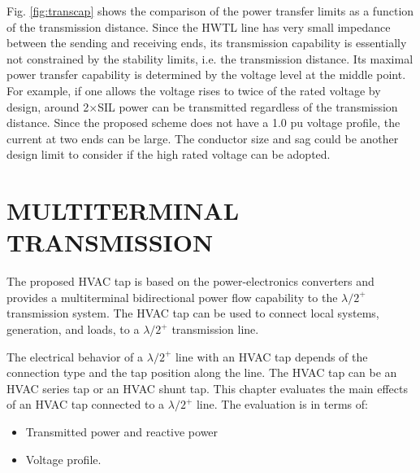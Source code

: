 \documentclass[12pt,a4paper]{reportmod}
\begin{document}
\par Fig. \ref{fig:transcap} shows the comparison of the power transfer limits as a function of the transmission distance. Since the HWTL line has very small impedance between the sending and receiving ends, its transmission capability is essentially not constrained by the stability limits, i.e. the transmission distance. Its maximal power transfer capability is determined by the voltage level at the middle point. For example, if one allows the voltage rises to twice of the rated voltage by design, around 2$\times$SIL power can be transmitted regardless of the transmission distance. Since the proposed scheme does not have a 1.0 pu voltage profile, the current at two ends can be large. The conductor size and sag could be another design limit to consider if the high rated voltage can be adopted.
\chapter{MULTITERMINAL TRANSMISSION}
\par The proposed HVAC tap is based on the power-electronics converters and provides a multiterminal bidirectional power flow capability to the $\lambda /2^+$ transmission system. The HVAC tap can be used to connect local systems, generation, and loads, to a $\lambda /2^+$ transmission line.
\par The electrical behavior of a $\lambda /2^+$ line with an HVAC tap depends of the connection type and the tap position along the line. The HVAC tap can be an HVAC series tap or an HVAC shunt tap. This chapter evaluates the main effects of an HVAC tap connected to a $\lambda /2^+$ line. The evaluation is in terms of: 
\begin{itemize}
\item Transmitted power and reactive power
\item Voltage profile.
\end{itemize}
\end{document}
